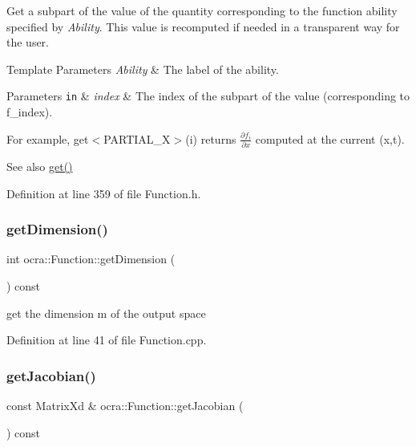 Get a subpart of the value of the quantity corresponding to the function ability specified by {\itshape Ability}. This value is recomputed if needed in a transparent way for the user.


\begin{DoxyTemplParams}{Template Parameters}
{\em Ability} & The label of the ability. \\
\hline
\end{DoxyTemplParams}

\begin{DoxyParams}[1]{Parameters}
\mbox{\tt in}  & {\em index} & The index of the subpart of the value (corresponding to f\+\_\+index).\\
\hline
\end{DoxyParams}
For example, get$<$\+P\+A\+R\+T\+I\+A\+L\+\_\+\+X$>$(i) returns $ \frac{\partial f_i}{\partial x}$ computed at the current (x,t).

\begin{DoxySeeAlso}{See also}
\hyperlink{classocra_1_1Function_a244404069d9ab169fbb23309785693b8}{get()} 
\end{DoxySeeAlso}


Definition at line 359 of file Function.\+h.

\hypertarget{classocra_1_1Function_a85da5fba27502737b0c7027c24cc6170}{}\label{classocra_1_1Function_a85da5fba27502737b0c7027c24cc6170} 
\subsubsection{\texorpdfstring{get\+Dimension()}{getDimension()}}
{\footnotesize\ttfamily int ocra\+::\+Function\+::get\+Dimension (\begin{DoxyParamCaption}{ }\end{DoxyParamCaption}) const}

get the dimension m of the output space 

Definition at line 41 of file Function.\+cpp.

\hypertarget{classocra_1_1Function_a14d855bebcf8a03878c0ff7857b27d37}{}\label{classocra_1_1Function_a14d855bebcf8a03878c0ff7857b27d37} 
\subsubsection{\texorpdfstring{get\+Jacobian()}{getJacobian()}\hspace{0.1cm}{\footnotesize\ttfamily [1/2]}}
{\footnotesize\ttfamily const Matrix\+Xd \& ocra\+::\+Function\+::get\+Jacobian (\begin{DoxyParamCaption}{ }\end{DoxyParamCaption}) const\hspace{0.3cm}{\ttfamily [inline]}}

